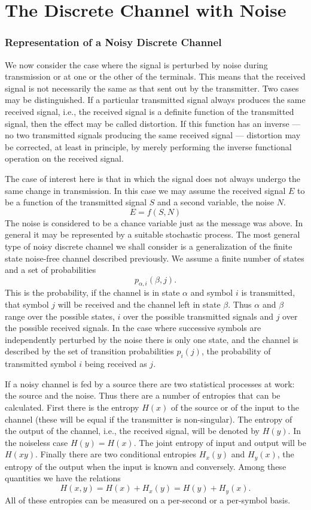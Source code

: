 \part{The Discrete Channel with Noise}

\section{Representation of a Noisy Discrete Channel}
We now consider the case where the signal is perturbed by noise during
transmission or at one or the other of the terminals.  This means
that the received signal is not necessarily the same as that sent out
by the transmitter.  Two cases may be distinguished.  If a particular
transmitted signal always produces the same received signal, i.e., the
received signal is a definite function of the transmitted signal, then
the effect may be called distortion.  If this function has an inverse
--- no two transmitted signals producing the same received signal ---
distortion may be corrected, at least in principle, by merely performing
the inverse functional operation on the received signal.

The case of interest here is that in which the signal does not always
undergo the same change in transmission.  In this case we may assume
the received signal $E$ to be a function of the transmitted signal $S$
and a second variable, the noise $N$.
$$
E = f(S,N)
$$
The noise is considered to be a chance variable just as the message
was above.  In general it may be represented by a suitable stochastic
process.  The most general type of noisy discrete channel we shall
consider is a generalization of the finite state noise-free channel
described previously.  We assume a finite number of states and a set
of probabilities
$$
p_{\alpha,i}(\beta,j).
$$
This is the probability, if the channel is in state $\alpha$ and symbol
$i$ is transmitted, that symbol $j$ will be received and the channel left
in state $\beta$.  Thus $\alpha$ and $\beta$ range over the possible
states, $i$ over the possible transmitted signals and $j$ over the
possible received signals.  In the case where successive symbols are
independently perturbed by the noise there is only one state, and the
channel is described by the set of transition probabilities $p_i(j)$,
the probability of transmitted symbol $i$ being received as $j$.

If a noisy channel is fed by a source there are two statistical processes
at work: the source and the noise.  Thus there are a number of entropies
that can be calculated.  First there is the entropy $H(x)$ of the source
or of the input to the channel (these will be equal if the transmitter
is non-singular).  The entropy of the output of the channel, i.e.,
the received signal, will be denoted by $H(y)$.  In the noiseless case
$H(y) = H(x)$.  The joint entropy of input and output will be
$H(xy)$.  Finally there are two conditional entropies $H_x(y)$ and $H_y(x)$,
the entropy of the output when the input is known and conversely.
Among these quantities we have the relations
$$
H(x,y) = H(x) + H_x(y) = H(y) + H_y(x).
$$
All of these entropies can be measured on a per-second or a per-symbol basis.

